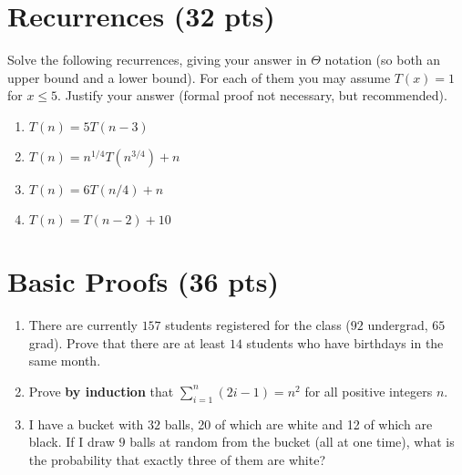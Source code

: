 \section{Recurrences (32 pts)}

Solve the following recurrences, giving your answer in $\Theta$ notation (so both an upper bound and a lower bound). For each of them you may assume $T(x) = 1$ for $x \leq 5$. Justify your answer (formal proof not necessary, but recommended).

\begin{enumerate}
\item $T(n) = 5 T(n-3)$

\item $T(n) = n^{1/4} T(n^{3/4}) + n$

\item $T(n) = 6 T(n/4) + n$

\item $T(n) = T(n-2) + 10$

\end{enumerate}


\section{Basic Proofs (36 pts)}
\begin{enumerate}

\item There are currently $157$ students registered for the class ($92$ undergrad, $65$ grad). Prove that there are at least $14$ students who have birthdays in the same month.

\item Prove \textbf{by induction} that $\sum_{i=1}^n (2i-1) = n^2$ for all positive integers $n$.

\item I have a bucket with $32$ balls, 20 of which are white and 12 of which are black. If I draw $9$ balls at random from the bucket (all at one time), what is the probability that exactly three of them are white?

\end{enumerate}





